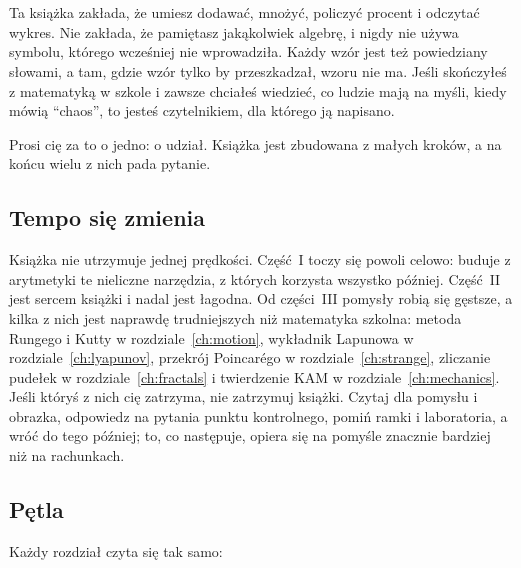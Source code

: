 
\chapter*{\lblHowToUse}
{}
\markboth{\lblHowToUse}{\lblHowToUse}

\noindent
Ta książka zakłada, że umiesz dodawać, mnożyć, policzyć procent i odczytać
wykres. Nie zakłada, że pamiętasz jakąkolwiek algebrę, i nigdy nie używa
symbolu, którego wcześniej nie wprowadziła. Każdy wzór jest też powiedziany
słowami, a tam, gdzie wzór tylko by przeszkadzał, wzoru nie ma. Jeśli
skończyłeś z matematyką w szkole i zawsze chciałeś wiedzieć, co ludzie mają
na myśli, kiedy mówią \enquote{chaos}, to jesteś czytelnikiem, dla którego ją
napisano.

Prosi cię za to o jedno: o udział. Książka jest zbudowana z małych kroków,
a na końcu wielu z nich pada pytanie.

\section*{Tempo się zmienia}

Książka nie utrzymuje jednej prędkości. Część~I toczy się powoli celowo:
buduje z arytmetyki te nieliczne narzędzia, z których korzysta wszystko
później. Część~II jest sercem książki i nadal jest łagodna. Od części~III
pomysły robią się gęstsze, a kilka z nich jest naprawdę trudniejszych niż
matematyka szkolna: metoda Rungego i Kutty w rozdziale~\ref{ch:motion},
wykładnik Lapunowa w rozdziale~\ref{ch:lyapunov}, przekrój Poincarégo w
rozdziale~\ref{ch:strange}, zliczanie pudełek w rozdziale~\ref{ch:fractals} i
twierdzenie KAM w rozdziale~\ref{ch:mechanics}. Jeśli któryś z nich cię
zatrzyma, nie zatrzymuj książki. Czytaj dla pomysłu i obrazka, odpowiedz na
pytania punktu kontrolnego, pomiń ramki \lblRigour{} i laboratoria, a wróć
do tego później; to, co następuje, opiera się na pomyśle znacznie bardziej
niż na rachunkach.

\section*{Pętla}

Każdy rozdział czyta się tak samo:

